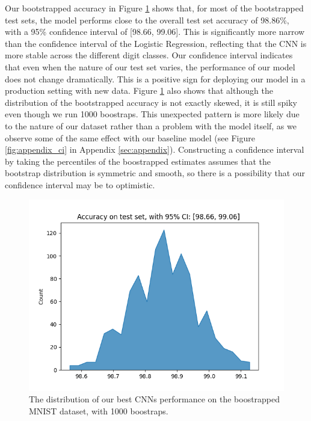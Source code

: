 \newpage
Our bootstrapped accuracy in Figure \ref{fig:cnn_conf} shows that, for most of the bootstrapped test sets, the model performs close to the overall test set accuracy of 98.86\%, with a 95\% confidence interval of [98.66, 99.06]. This is significantly more narrow than the confidence interval of the Logistic Regression, reflecting that the CNN is more stable across the different digit classes. Our confidence interval indicates that even when the nature of our test set varies, the performance of our model does not change dramatically. This is a positive sign for deploying our model in a production setting with new data. 
Figure \ref{fig:cnn_conf} also shows that although the distribution of the bootstrapped accuracy is not exactly skewed, it is still spiky even though we run 1000 boostraps. This unexpected pattern is more likely due to the nature of our dataset rather than a problem with the model itself, as we observe some of the same effect with our baseline model (see Figure \ref{fig:appendix_ci} in Appendix \ref{sec:appendix}). Constructing a confidence interval by taking the percentiles of the boostrapped estimates assumes that the bootstrap distribution is symmetric and smooth, so there is a possibility that our confidence interval may be to optimistic. \cite{davison1997bibliography}
\newline
\newline
\begin{figure}[H]
    \centering
    \includegraphics[width=0.7\linewidth]{results/evaluation/cnn_confidence.png}
    \caption{The distribution of our best CNNs performance on the boostrapped MNIST dataset, with 1000 boostraps.}
    \label{fig:cnn_conf}
\end{figure}

\newpage
